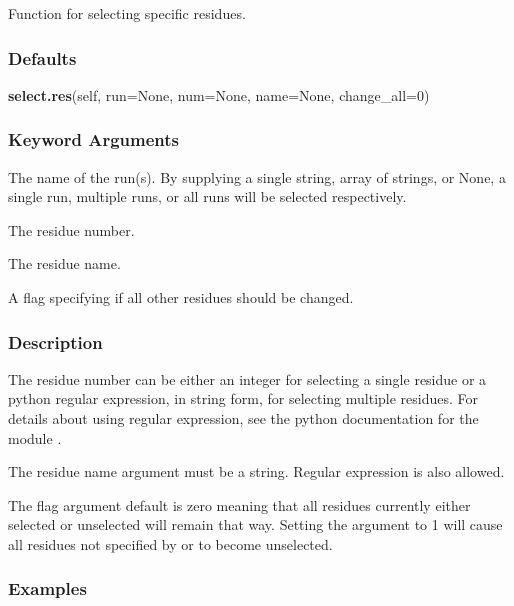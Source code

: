  Function for selecting specific residues. 
  

  
 \subsubsection{Defaults} 

 \textsf{\textbf{select.res}(self, run=None, num=None, name=None, change\_all=0)} 

  
 \subsubsection{Keyword Arguments} 

   The name of the run(s).  By supplying a single string, array of strings, or None, a single run, multiple runs, or all runs will be selected respectively.   

   The residue number.   

   The residue name.   

   A flag specifying if all other residues should be changed.  

  

  
 \subsubsection{Description} 

 The residue number can be either an integer for selecting a single residue or a python regular expression, in string form, for selecting multiple residues.  For details about using regular expression, see the python documentation for the module . 
  

 The residue name argument must be a string.  Regular expression is also allowed. 
  

 The  flag argument default is zero meaning that all residues currently either selected or unselected will remain that way.  Setting the argument to 1 will cause all residues not specified by  or  to become unselected. 
  

  
 \subsubsection{Examples} 

